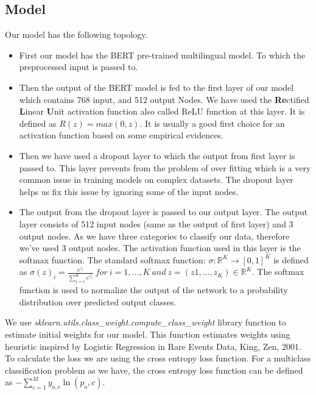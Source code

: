 \documentclass[a4paper, 12pt]{article}
\begin{document}
\begin{sloppypar}
  \subsection{Model}
  
  Our model has the following topology.
  \begin{itemize}
  \item{First our model has the BERT pre-trained multilingual model. To which the preprocessed input is passed to.}
  
  \item{Then the output of the BERT model is fed to the first layer of our model which contains 768 input, and 512 output Nodes. We have used the \textbf{Re}ctified \textbf{L}inear \textbf{U}nit activation function also called ReLU function at this layer. It is defined as $R(z) = max(0,z)$. It is usually a good first choice for an activation function based on some empirical evidences.}
  
  \item{Then we have used a dropout layer to which the output from first layer is passed to. This layer prevents from the problem of over fitting which is a very common issue in training models on complex datasets. The dropout layer helps us fix this issue by ignoring some of the input nodes. }\cite{srivastava_dropout_nodate}
  
  \item{The output from the dropout layer is passed to our output layer. The output layer consists of 512 input nodes (same as the output of first layer) and 3 output nodes. As we have three categories to classify our data, therefore we've used 3 output nodes. The activation function used in this layer is the softmax function. The standard softmax function: $ \sigma : \mathbb{R}^K \rightarrow [0,1]^K $ is defined as \large
  $\sigma(z)_i = \frac{e^{z_i}}{\sum_{j = 1} ^{ K} e^{z_j}}\  for\  i = 1, ... , K\  and\  z = (z1, ..., z_K) \in \mathbb{R}^K$. 
  \normalsize
  The softmax function is used to normalize the output of the  network to a probability distribution over predicted output classes. }\cite{noauthor_softmax_2021}
  
  \end{itemize}
  
  We use \textit{sklearn.utils.class\_weight.compute\_class\_weight} library function to estimate initial weights for our model. This function estimates weights using heuristic inspired by  Logistic Regression in Rare Events Data, King, Zen, 2001.\cite{king_logistic_2001}
  To calculate the loss we are using the cross entropy loss function. For a multiclass classification problem as we have, the cross entropy loss function can be defined as \large $- \sum_{c=1}^{M} y_{o,c} \ln(p_o,c)$.\cite{noauthor_loss_nodate}
  \normalsize
  

\end{sloppypar}
\end{document}
